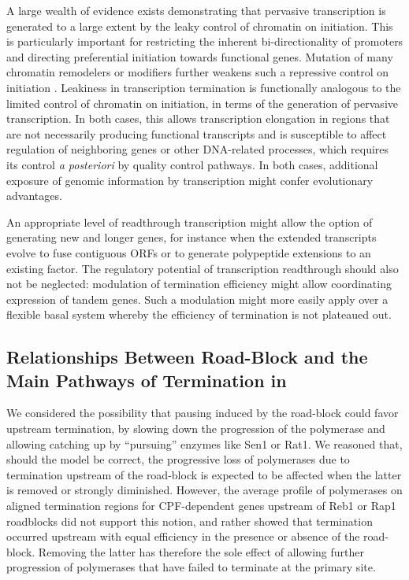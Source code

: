 A large wealth of evidence exists demonstrating that pervasive transcription is generated to a large extent by the leaky control of chromatin on initiation. This is particularly important for restricting the inherent bi-directionality of promoters and directing preferential initiation towards functional genes. Mutation of many chromatin remodelers or modifiers further weakens such a repressive control on initiation \cite{marquardt:2014:chromatinbased}. Leakiness in transcription termination is functionally analogous to the limited control of chromatin on initiation, in terms of the generation of pervasive transcription. In both cases, this allows transcription elongation in regions that are not necessarily producing functional transcripts and is susceptible to affect regulation of neighboring genes or other DNA-related processes, which requires its control \textit{a posteriori} by quality control pathways. In both cases, additional exposure of genomic information by transcription might confer evolutionary advantages.  

An appropriate level of readthrough transcription might allow the option of generating new and longer genes, for instance when the extended transcripts evolve to fuse contiguous ORFs or to generate polypeptide extensions to an existing factor. The regulatory potential of transcription readthrough should also not be neglected: modulation of termination efficiency might allow coordinating expression of tandem genes. Such a modulation might more easily apply over a flexible basal system whereby the efficiency of termination is not plateaued out.


\singlespacing
\subsection*{Relationships Between Road-Block and the Main Pathways of Termination in \cer{}}
\doublespacing


We considered the possibility that pausing induced by the road-block could favor upstream termination, by slowing down the progression of the polymerase and allowing catching up by “pursuing” enzymes like Sen1 or Rat1.  We reasoned that, should the model be correct, the progressive loss of polymerases due to termination upstream of the road-block is expected to be affected when the latter is removed or strongly diminished. However, the average profile of polymerases on aligned termination regions for CPF-dependent genes upstream of Reb1 or Rap1 roadblocks did not support this notion, and rather showed that termination occurred upstream with equal efficiency in the presence or absence of the road-block. Removing the latter has therefore the sole effect of allowing further progression of polymerases that have failed to terminate at the primary site. 

